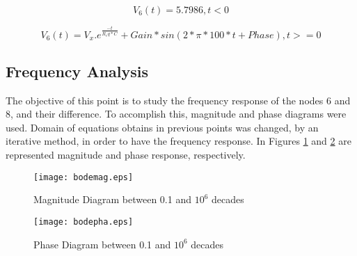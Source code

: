 \begin{equation}
    V_6 (t) = 5.7986,   t<0
    \label{}
\end{equation}

\begin{equation}
    V_6 (t) = V_x . e ^ \frac{-t}{R_eq * C} + Gain * sin(2 * \pi * 100 * t + Phase) , t>=0
    \label{}
\end{equation}



\subsection{Frequency Analysis}

The objective of this point is to study the frequency response of the nodes 6 and 8, and their difference. To accomplish this, magnitude and phase diagrams were used. Domain of equations obtains in previous points was changed, by an iterative method, in order to have the frequency response.
In Figures \ref{fig:bodemag} and \ref{fig:bodepha} are represented magnitude and phase response, respectively.

\begin{figure}[h] \centering
\texttt{[image: bodemag.eps]}
\caption{Magnitude Diagram between 0.1 and $10^6$ decades}
\label{fig:bodemag}
\end{figure}

\begin{figure}[h] \centering
\texttt{[image: bodepha.eps]}
\caption{Phase Diagram between 0.1 and $10^6$ decades}
\label{fig:bodepha}
\end{figure}

\newpage
